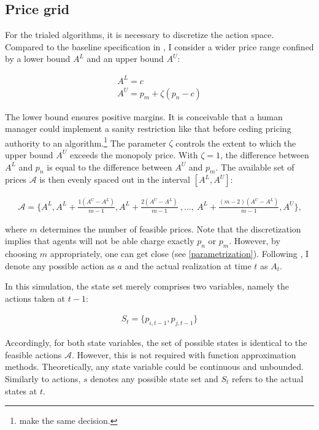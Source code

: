 \subsection{Price grid}

For the trialed algorithms, it is necessary to discretize the action space. Compared to the baseline specification in \textcite[p.3274]{calvano_artificial_2020}, I consider a wider price range confined by a lower bound $A^L$ and an upper bound $A^U$:

\begin{gather}\label{price_grid_formula}
A^{L} = c \\
A^{U} = p_m + \zeta (p_n - c)
\end{gather}

The lower bound ensures positive margins. It is conceivable that a human manager could implement a sanity restriction like that before ceding pricing authority to an algorithm.\footnote{\textcite[p.13]{johnson_platform_2020} make the same decision.} The parameter $\zeta$ controls the extent to which the upper bound $A^U$ exceeds the monopoly price. With $\zeta = 1$, the difference between $A^{L}$ and $p_n$ is equal to the difference between $A^{U}$ and $p_m$. The available set of prices $\mathcal{A}$ is then evenly spaced out in the interval $[A^L, A^U]$:

\begin{gather}\label{available_prices}
\mathcal{A} = \{A^L, A^L + \frac{1(A^U - A^L)}{m-1}, A^L + \frac{2(A^U - A^L)}{m-1}~ , ... , ~ A^L + \frac{(m-2)(A^U - A^L)}{m-1}, A^U\} \text{,}
\end{gather}

where $m$ determines the number of feasible prices. Note that the discretization implies that agents will not be able charge exactly $p_n$ or $p_m$. However, by choosing $m$ appropriately, one can get close (see \autoref{parametrization}). Following \textcite{sutton_reinforcement_2018}, I denote any possible action as $a$ and the actual realization at time $t$ as $A_t$.

In this simulation, the state set merely comprises two variables, namely the actions taken at $t-1$:

\begin{gather}
S_t = \{ p_{i, t-1}, p_{j, t-1} \}
\end{gather}

Accordingly, for both state variables, the set of possible states is identical to the feasible actions $\mathcal{A}$. However, this is not required with function approximation methods. Theoretically, any state variable could be continuous and unbounded. Similarly to actions, $s$ denotes any possible state set and $S_t$ refers to the actual states at $t$.


